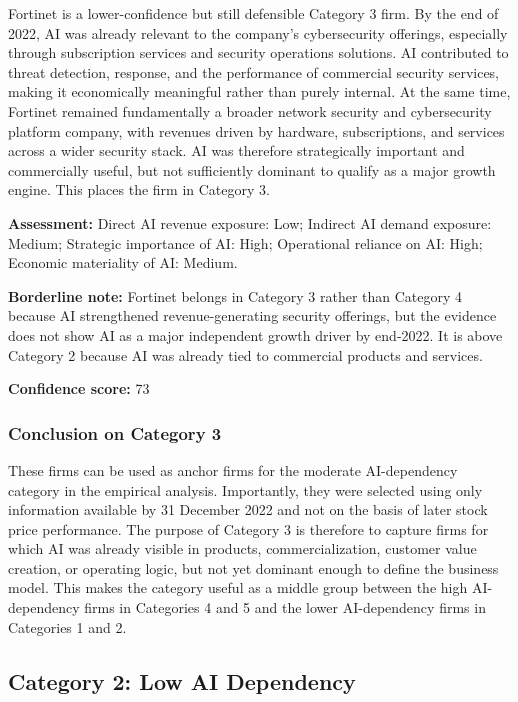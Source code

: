 \documentclass{article}
\begin{document}
Fortinet is a lower-confidence but still defensible Category 3 firm. By the end of 2022, AI was already relevant to the company’s cybersecurity offerings, especially through subscription services and security operations solutions. AI contributed to threat detection, response, and the performance of commercial security services, making it economically meaningful rather than purely internal. At the same time, Fortinet remained fundamentally a broader network security and cybersecurity platform company, with revenues driven by hardware, subscriptions, and services across a wider security stack. AI was therefore strategically important and commercially useful, but not sufficiently dominant to qualify as a major growth engine. This places the firm in Category 3.

\textbf{Assessment:} Direct AI revenue exposure: Low; Indirect AI demand exposure: Medium; Strategic importance of AI: High; Operational reliance on AI: High; Economic materiality of AI: Medium.

\textbf{Borderline note:} Fortinet belongs in Category 3 rather than Category 4 because AI strengthened revenue-generating security offerings, but the evidence does not show AI as a major independent growth driver by end-2022. It is above Category 2 because AI was already tied to commercial products and services.

\textbf{Confidence score:} 73

\subsubsection*{Conclusion on Category 3}

These firms can be used as anchor firms for the moderate AI-dependency category in the empirical analysis. Importantly, they were selected using only information available by 31 December 2022 and not on the basis of later stock price performance. The purpose of Category 3 is therefore to capture firms for which AI was already visible in products, commercialization, customer value creation, or operating logic, but not yet dominant enough to define the business model. This makes the category useful as a middle group between the high AI-dependency firms in Categories 4 and 5 and the lower AI-dependency firms in Categories 1 and 2.

\subsection{Category 2: Low AI Dependency}
\end{document}
